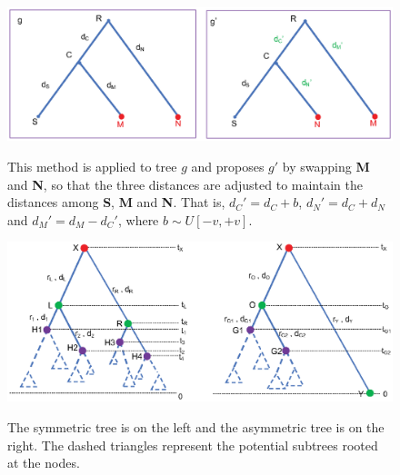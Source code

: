 \documentclass{bmcart}
\begin{document}
\begin{backmatter}
\begin{figure}[h!]
\includegraphics[width=12cm]{Fig04-exchangemethod.eps}\\
\caption{
             This method is applied to tree $g$ and proposes $g'$ by swapping \textbf{M} and \textbf{N}, so that the three distances are adjusted to maintain the distances among \textbf{S}, \textbf{M} and \textbf{N}. That is, ${d_C}' = {d_C} + b$, ${d_N}' = d_C + d_N$ and ${d_M}' = d_{M} - {d_C}'$, where $b \sim U[ - v, + v]$.}
\label{exchangemethod}
\end{figure}

\begin{figure}[h!]
\includegraphics[width=12cm]{Fig05-treeshape.eps}\\
\caption{
             The symmetric tree is on the left and the asymmetric tree is on the right. The dashed triangles represent the potential subtrees rooted at the nodes.}
\label{treeshape}
\end{figure}


\end{backmatter}
\end{document}
